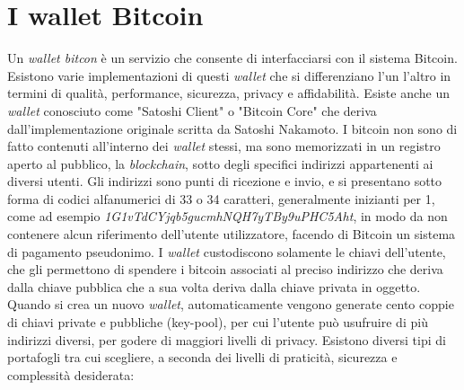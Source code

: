 \section{I wallet Bitcoin}
Un \textit{wallet bitcon} \`e un servizio che consente di interfacciarsi con il sistema Bitcoin. Esistono varie implementazioni di questi \textit{wallet} che si differenziano l'un l'altro in termini di qualit\`a, performance, sicurezza, privacy e affidabilit\`a. Esiste anche un \textit{wallet} conosciuto come "Satoshi Client" o "Bitcoin Core" che deriva dall'implementazione originale scritta da Satoshi Nakamoto.
I bitcoin non sono di fatto contenuti all'interno dei \textit{wallet} stessi, ma sono memorizzati in un registro aperto al pubblico, la \textit{blockchain}, sotto degli specifici indirizzi appartenenti ai diversi utenti. Gli indirizzi sono punti di ricezione e invio, e si presentano sotto forma di codici alfanumerici di 33 o 34 caratteri, generalmente inizianti per 1, come ad esempio \textit{1G1vTdCYjqb5gucmhNQH7yTBy9uPHC5Aht}, in modo da non contenere alcun
riferimento dell'utente utilizzatore, facendo di Bitcoin un sistema di pagamento pseudonimo. 
I \textit{wallet} custodiscono solamente le chiavi dell'utente, che gli permettono di spendere i bitcoin associati al preciso indirizzo che deriva dalla chiave pubblica che a sua volta deriva dalla chiave privata in oggetto. Quando si crea un nuovo \textit{wallet}, automaticamente vengono generate cento coppie di chiavi private e pubbliche (key-pool), per cui l'utente pu\`o usufruire di pi\`u indirizzi
diversi, per godere di maggiori livelli di privacy. 
Esistono diversi tipi di portafogli tra cui scegliere, a seconda dei livelli di praticit\`a, sicurezza e complessit\`a desiderata: 
